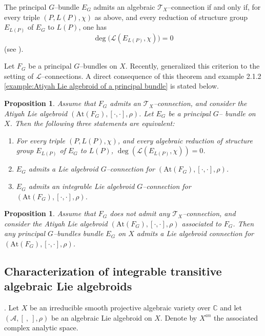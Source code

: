 \documentclass[12pt,reqno]{amsart}
\numberwithin{equation}{subsection}
\newtheorem{proposition}[equation]{Proposition}
\theoremstyle{definition}
\theoremstyle{theorem}
\begin{document}
The principal $G$--bundle $E_{G}$ admits an algebraic $\mathcal{T}_{X}$--connection if and only if, for every triple $(P, L(P), \chi)$ as above, and every reduction of structure group $E_{L(P)}$ of $E_{G}$ to $L(P)$, one has
\[
\deg \bigl(\mathscr{L}(E_{L(P)}, \chi)\bigr)=0
\]
(see \cite{Azad-Biswas-2002}).

Let $F_{G}$ be a principal $G$--bundles on $X$. Recently, \cite[Theorem 6.1]{Biswas-2026} generalized this criterion to the setting of $\mathcal{L}$--connections. A direct consequence of this theorem and example 2.1.2 \eqref{example:Atiyah Lie algebroid of a principal bundle} is stated below.

\begin{proposition}
	 Assume that $F_{G}$ admits an $\mathcal{T}_{X}$--connection, and consider the Atiyah Lie algebroid $(\text{At}(F_{G}), [\cdot,\cdot],\rho)$. Let $E_{G}$ be a principal $G$-- bundle on $X$. Then the following three statements are equivalent:
	\begin{enumerate}
		\item For every triple $(P, L(P), \chi)$, and every algebraic reduction of structure group $E_{L(P)}$ of
		$E_{G}$ to $L(P)$, $\deg(\mathscr{L}(E_{L(P)}, \chi)) = 0$.
		\item $E_{G}$ admits a Lie algebroid $G$--connection for $(\text{At}(F_{G}),[\cdot,\cdot],\rho)$.
		\item $E_{G}$ admits an integrable Lie algebroid $G$--connection for $(\text{At}(F_{G}),[\cdot,\cdot],\rho)$. 
	\end{enumerate}
\end{proposition}

\begin{proposition}
	Assume that $F_{G}$ does not admit any $\mathcal{T}_{X}$--connection, and
	consider the Atiyah Lie algebroid $(\text{At}(F_{G}), [\cdot,\cdot],\rho)$ associated to $F_{G}$. Then any principal $G$--bundles bundle $E_{G}$ on $X$ admits a Lie algebroid connection for $(\text{At}(F_{G}), [\cdot,\cdot],\rho)$.
\end{proposition}







\subsection{Characterization of integrable transitive algebraic Lie algebroids}.
Let $X$ be an irreducible smooth projective algebraic variety over $\mathbb{C}$ and let $(\mathcal{A},[\ ,\ ],\rho)$ be an algebraic Lie algebroid on $X$.
Denote by $X^{an}$ the associated complex analytic space.
\end{document}
